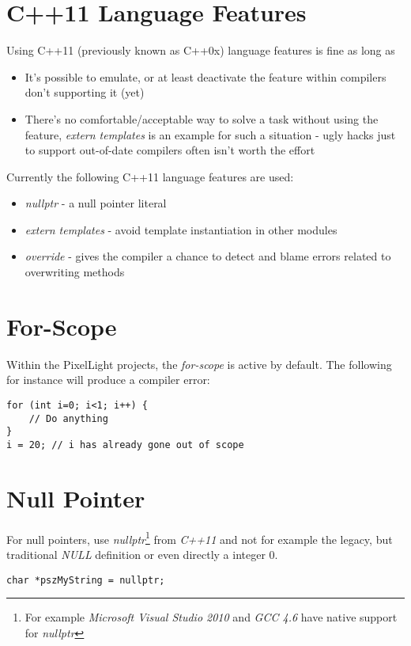 \section{C++11 Language Features}
Using C++11 (previously known as C++0x) language features is fine as long as
\begin{itemize}
\item{It's possible to emulate, or at least deactivate the feature within compilers don't supporting it (yet)}
\item{There's no comfortable/acceptable way to solve a task without using the feature, \emph{extern templates} is an example for such a situation - ugly hacks just to support out-of-date compilers often isn't worth the effort}
\end{itemize}
\textsl{}
Currently the following C++11 language features are used:
\begin{itemize}
\item{\emph{nullptr} - a null pointer literal}
\item{\emph{extern templates} - avoid template instantiation in other modules}
\item{\emph{override} - gives the compiler a chance to detect and blame errors related to overwriting methods}
\end{itemize}





\section{For-Scope}
Within the PixelLight projects, the \emph{for-scope} is active by default. The following for instance will produce a compiler error:
\begin{lstlisting}[caption=for-scope]
for (int i=0; i<1; i++) {
	// Do anything
}
i = 20;	// i has already gone out of scope
\end{lstlisting}




\section{Null Pointer}
For null pointers, use \emph{nullptr}\footnote{For example \emph{Microsoft Visual Studio 2010} and \emph{GCC 4.6} have native support for \emph{nullptr}} from \emph{C++11} and not for example the legacy, but traditional \emph{NULL} definition or even directly a integer $0$.

\begin{lstlisting}[caption=Null pointer]
char *pszMyString = nullptr;
\end{lstlisting}




